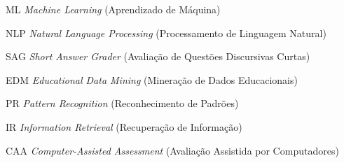 \documentclass[
	12pt,				%
	openright,			%
	twoside,			%
	a4paper,			%
	english,			%
	french,				%
	spanish,			%
	brazil				%
	]{abntex2}
\begin{document}
\listoffigures*
\cleardoublepage

\listoftables*
\cleardoublepage

\begin{siglas}
  \item[ML] \textit{Machine Learning} (Aprendizado de Máquina)
  \item[NLP] \textit{Natural Language Processing} (Processamento de Linguagem Natural)
  \item[SAG] \textit{Short Answer Grader} (Avaliação de Questões Discursivas Curtas)
  \item[EDM] \textit{Educational Data Mining} (Mineração de Dados Educacionais)
  \item[PR] \textit{Pattern Recognition} (Reconhecimento de Padrões)
  \item[IR] \textit{Information Retrieval} (Recuperação de Informação)
  \item[CAA] \textit{Computer-Assisted Assessment} (Avaliação Assistida por Computadores)
\end{siglas}

\tableofcontents*
\cleardoublepage

\newpage



\textual









\postextual




\begin{apendicesenv}

\partapendices




\end{apendicesenv}


\printindex

\end{document}
